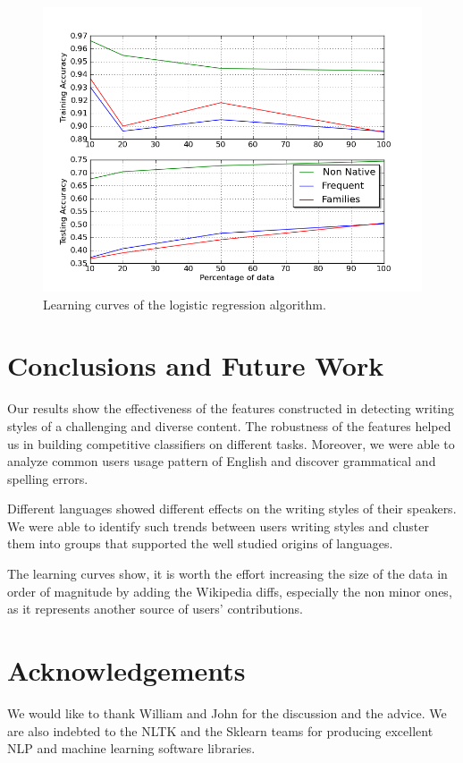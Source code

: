 \documentclass[10pt,a5paper,twoside]{article}
\begin{document}
\begin{figure}[t]
\centering
\includegraphics[scale=0.45]{combined_lc.png}
\caption{Learning curves of the logistic regression algorithm.}
\label{comb_lc}
\end{figure}


\section*{Conclusions and Future Work}
\label{conc}

Our results show the effectiveness of the features constructed in detecting writing styles
of a challenging and diverse content. The robustness of the features helped us
in building competitive classifiers on different tasks. Moreover, we were able
to analyze common users usage pattern of English and discover grammatical and
spelling errors.

Different languages showed different effects on the writing styles of their
speakers. We were able to identify such trends between users writing styles and
cluster them into groups that supported the well studied origins of languages.

The learning curves show, it is worth the effort increasing the size
of the data in order of magnitude by adding the Wikipedia diffs, especially the
non minor ones, as it represents another source of users' contributions.

\section*{Acknowledgements}
We would like to thank William and John for the discussion and the advice.
We are also indebted to the NLTK and the Sklearn teams for producing excellent
NLP and machine learning software libraries.

\newpage
{}

\end{document}
